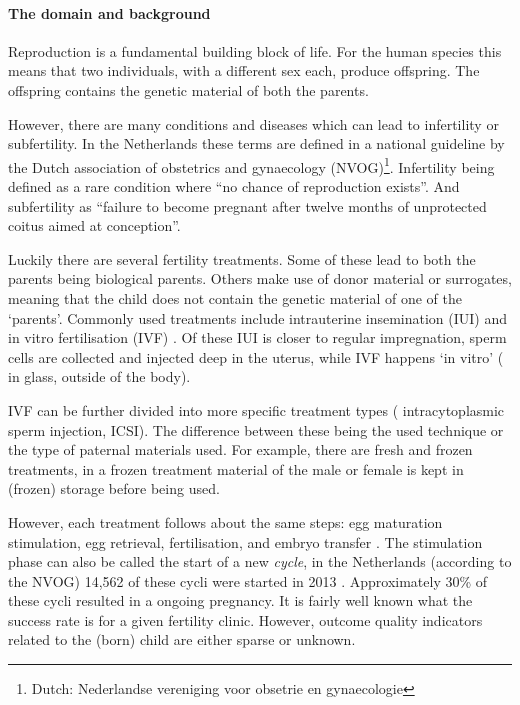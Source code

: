 \paragraph{The domain and background}
Reproduction is a fundamental building block of life.
For the human species this means that two individuals, with a different sex each, produce offspring.
The offspring contains the genetic material of both the parents.

However, there are many conditions and diseases which can lead to infertility or subfertility.
In the Netherlands these terms are defined in a national guideline by the Dutch association of obstetrics and gynaecology (NVOG)\footnote{Dutch: Nederlandse vereniging voor obsetrie en gynaecologie}\cite{subfertilityGuideline}.
Infertility being defined as a rare condition where ``no chance of reproduction exists''.
And subfertility as ``failure to become pregnant after twelve months of unprotected coitus aimed at conception''.

Luckily there are several fertility treatments.
Some of these lead to both the parents being biological parents. 
Others make use of donor material or surrogates, meaning that the child does not contain the genetic material of one of the `parents'.
Commonly used treatments include intrauterine insemination (IUI) and in vitro fertilisation (IVF) \cite{treatmentExplanation}.
Of these IUI is closer to regular impregnation, sperm cells are collected and injected deep in the uterus, while IVF happens `in vitro' (\ie{} in glass, outside of the body).

IVF can be further divided into more specific treatment types (\eg{} intracytoplasmic sperm injection, ICSI).
The difference between these being the used technique or the type of paternal materials used.
For example, there are fresh and frozen treatments, in a frozen treatment material of the male or female is kept in (frozen) storage before being used.

However, each treatment follows about the same steps: egg maturation stimulation, egg retrieval, fertilisation, and embryo transfer \cite{treatmentExplanation}.
The stimulation phase can also be called the start of a new \emph{cycle}, in the Netherlands (according to the NVOG) 14,562 of these cycli were started in 2013 \cite{ivfReportNVOG2013}.
Approximately 30\% of these cycli resulted in a ongoing pregnancy.
It is fairly well known what the success rate is for a given fertility clinic.
However, outcome quality indicators related to the (born) child are either sparse or unknown.

